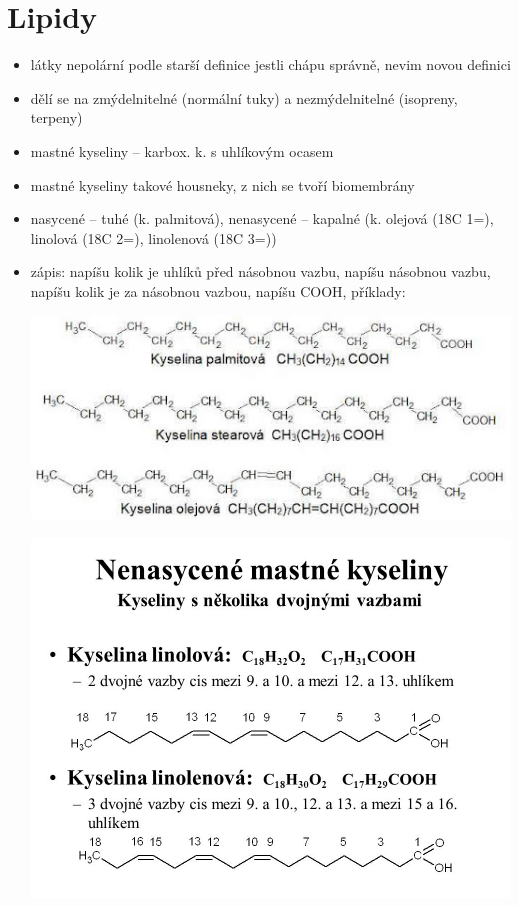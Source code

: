 \documentclass{article}
\begin{document}
\section{Lipidy}
\begin{itemize}
  \item látky nepolární podle starší definice jestli chápu správně, nevim novou definici
  \item dělí se na zmýdelnitelné (normální tuky) a nezmýdelnitelné (isopreny, terpeny)
  \item mastné kyseliny -- karbox. k. s uhlíkovým ocasem
  \item mastné kyseliny takové housneky, z nich se tvoří biomembrány
  \item nasycené -- tuhé (k. palmitová), nenasycené -- kapalné (k. olejová (18C 1=), linolová (18C 2=), linolenová (18C 3=))
  \item zápis: napíšu kolik je uhlíků před násobnou vazbu, napíšu násobnou vazbu, napíšu kolik je za násobnou vazbou, napíšu COOH, příklady: \\
  \begin{minipage}{0.5\textwidth}
      \includegraphics[width=\linewidth]{mastne_kyseliny.jpg}
  \end{minipage}
  \hfill
  \noindent\begin{minipage}{0.5\textwidth}
      \includegraphics[width=\linewidth]{nenasycene_mastne_kyseliny.jpg}

\end{minipage}
\end{itemize}
\end{document}
